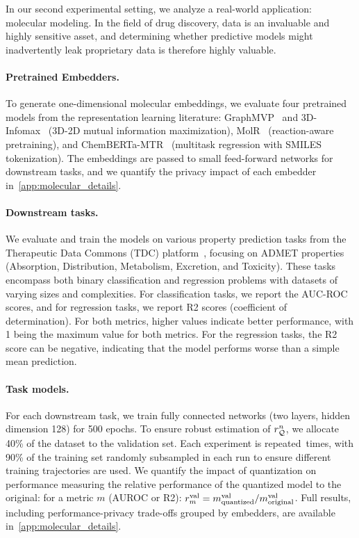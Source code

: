 In our second experimental setting, we analyze a real-world application: molecular modeling.
In the field of drug discovery, data is an invaluable and highly sensitive asset, and determining whether predictive models might inadvertently leak proprietary data is therefore highly valuable.


\paragraph{Pretrained Embedders.}
To generate one-dimensional molecular embeddings, we evaluate four pretrained models from the  representation learning literature: GraphMVP~\cite{liu2022pretraining} and 3D-Infomax~\cite{stark2021_3dinfomax} (3D-2D mutual information maximization), MolR~\cite{wang2022chemicalreactionaware} (reaction-aware pretraining), and ChemBERTa-MTR~\cite{ahmad2022chemberta2} (multitask regression with SMILES tokenization).
The embeddings are passed to small feed-forward networks for downstream tasks, and we quantify the privacy impact of each embedder in~\autoref{app:molecular_details}.


\paragraph{Downstream tasks.}
We evaluate and train the models on various property prediction tasks from the Therapeutic Data Commons (TDC) platform~\cite{Huang2021tdc}, focusing on ADMET properties (Absorption, Distribution, Metabolism, Excretion, and Toxicity).
These tasks encompass both binary classification and regression problems with datasets of varying sizes and complexities.
For classification tasks, we report the AUC-ROC scores, and for regression tasks, we report R2 scores (coefficient of determination).
For both metrics, higher values indicate better performance, with 1 being the maximum value for both metrics.
For the regression tasks, the R2 score can be negative, indicating that the model performs worse than a simple mean prediction.

\paragraph{Task models.}
For each downstream task, we train fully connected networks (two layers, hidden dimension 128) for 500 epochs.
To ensure robust estimation of $r_{{\mathcal{Q}}}^n$, we allocate 40\% of the dataset to the validation set.
Each experiment is repeated~\nrunmol times, with 90\% of the training set randomly subsampled in each run to ensure different training trajectories are used.
We quantify the impact of quantization on performance measuring the relative performance of the quantized model to the original: for a metric $m$ (AUROC or R2): \(
r^{\textrm{val}}_{m} = {m^{\textrm{val}}_{\text{quantized}}}/{m^{\textrm{val}}_{\text{original}}}
\).
Full results, including performance-privacy trade-offs grouped by embedders, are available in~\autoref{app:molecular_details}.

